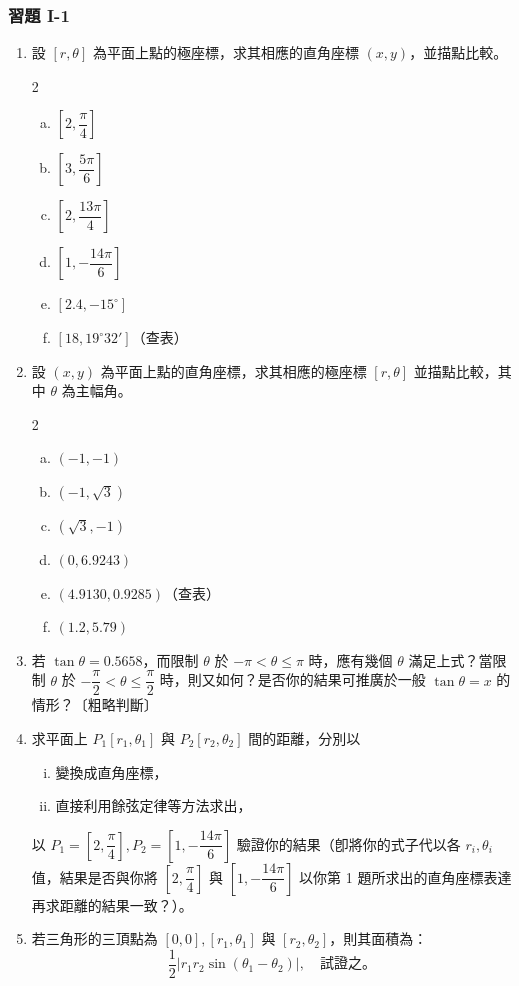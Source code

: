\subsubsection*{習題 I-1}
\begin{enumerate}
  \item 設 $[r, \theta]$ 為平面上點的極座標，求其相應的直角座標 $(x, y)$，並描點比較。
  \begin{multicols}{2}
  \begin{enumerate}[(a)]
    \item $\left[2, \dfrac{\pi}{4}\right]$
    \item $\left[3, \dfrac{5\pi}{6}\right]$
    \item $\left[2, \dfrac{13\pi}{4}\right]$
    \item $\left[1, -\dfrac{14\pi}{6}\right]$
    \item $[2.4, -15^\circ]$
    \item $[18, 19^\circ 32']$（查表）
  \end{enumerate}
  \end{multicols}

  \item 設 $(x, y)$ 為平面上點的直角座標，求其相應的極座標 $[r, \theta]$ 並描點比較，其中 $\theta$ 為主幅角。
  \begin{multicols}{2}
  \begin{enumerate}[(a)]
    \item $(-1, -1)$
    \item $(-1, \sqrt{3})$
    \item $(\sqrt{3}, -1)$
    \item $(0, 6.9243)$
    \item $(4.9130, 0.9285)$（查表）
    \item $(1.2, 5.79)$
  \end{enumerate}
  \end{multicols}

  \item 若 $\tan\theta = 0.5658$，而限制 $\theta$ 於 $-\pi < \theta \le \pi$ 時，應有幾個 $\theta$ 滿足上式？當限制 $\theta$ 於 $-\dfrac{\pi}{2} < \theta \le \dfrac{\pi}{2}$ 時，則又如何？是否你的結果可推廣於一般 $\tan\theta = x$ 的情形？〔粗略判斷〕

  \item 求平面上 $P_1[r_1, \theta_1]$ 與 $P_2[r_2, \theta_2]$ 間的距離，分別以
  \begin{enumerate}[(i)]
    \item 變換成直角座標，
    \item 直接利用餘弦定律等方法求出，
  \end{enumerate}
  以 $P_1 = \left[2, \dfrac{\pi}{4}\right], P_2 = \left[1, -\dfrac{14\pi}{6}\right]$ 驗證你的結果（卽將你的式子代以各 $r_i, \theta_i$ 值，結果是否與你將 $\left[2, \dfrac{\pi}{4}\right]$ 與 $\left[1, -\dfrac{14\pi}{6}\right]$ 以你第 1 題所求出的直角座標表達再求距離的結果一致？）。

  \item 若三角形的三頂點為 $[0, 0], [r_1, \theta_1]$ 與 $[r_2, \theta_2]$，則其面積為：
  \[ \frac{1}{2} |r_1 r_2 \sin(\theta_1 - \theta_2)|, \quad \text{試證之。} \]
\end{enumerate}
